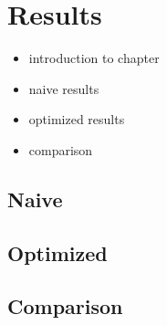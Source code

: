 \chapter{Results}
\begin{itemize}
    \item introduction to chapter
    \item naive results
    \item optimized results
    \item comparison
\end{itemize}

\section{Naive}


\section{Optimized}



\section{Comparison}



